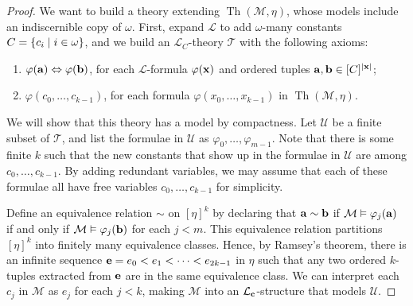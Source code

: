 \begin{proof}
	We want to build a theory extending \( \operatorname{Th}(\mathcal M, \eta) \), whose models include an indiscernible copy of \( \omega \).
	First, expand \( \mathcal L \) to add \( \omega \)-many constants \( C = \qty{c_i \mid i \in \omega} \), and we build an \( \mathcal L_C \)-theory \( \mathcal T \) with the following axioms:
	\begin{enumerate}
		\item \( \varphi(\vb a) \Leftrightarrow \varphi(\vb b) \), for each \( \mathcal L \)-formula \( \varphi(\vb x) \) and ordered tuples \( \vb a, \vb b \in [C]^{\abs{\vb x}} \);
		\item \( \varphi(c_0, \dots, c_{k-1}) \), for each formula \( \varphi(x_0, \dots, x_{k-1}) \) in \( \operatorname{Th}(\mathcal M, \eta) \). 
	\end{enumerate}
	We will show that this theory has a model by compactness.
	Let \( \mathcal U \) be a finite subset of \( \mathcal T \), and list the formulae in \( \mathcal U \) as \( \varphi_0, \dots, \varphi_{m-1} \).
	Note that there is some finite \( k \) such that the new constants that show up in the formulae in \( \mathcal U \) are among \( c_0, \dots, c_{k-1} \).
	By adding redundant variables, we may assume that each of these formulae all have free variables \( c_0, \dots, c_{k-1} \) for simplicity.

	Define an equivalence relation \( \sim \) on \( [\eta]^k \) by declaring that \( \vb a \sim \vb b \) if \( \mathcal M \vDash \varphi_j(\vb a) \) if and only if \( \mathcal M \vDash \varphi_j(\vb b) \) for each \( j < m \).
	This equivalence relation partitions \( [\eta]^k \) into finitely many equivalence classes.
	Hence, by Ramsey's theorem, there is an infinite sequence \( \vb e = e_0 < e_1 < \dots < e_{2k-1} \) in \( \eta \) such that any two ordered \( k \)-tuples extracted from \( \vb e \) are in the same equivalence class.
	We can interpret each \( c_j \) in \( \mathcal M \) as \( e_j \) for each \( j < k \), making \( \mathcal M \) into an \( \mathcal L_{\vb c} \)-structure that models \( \mathcal U \).
	

\end{proof}
